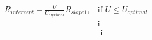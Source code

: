 \documentclass[preview]{standalone}
\begin{document}
\begin{align*}
R_{intercept} +  \frac{U}{U_{Optimal}} R_{slope1}, & \text{if }  U \leq U_{optimal}  \\[6pt] & \text{i } \\ & \text{ i}
\end{align*}
\end{document}
